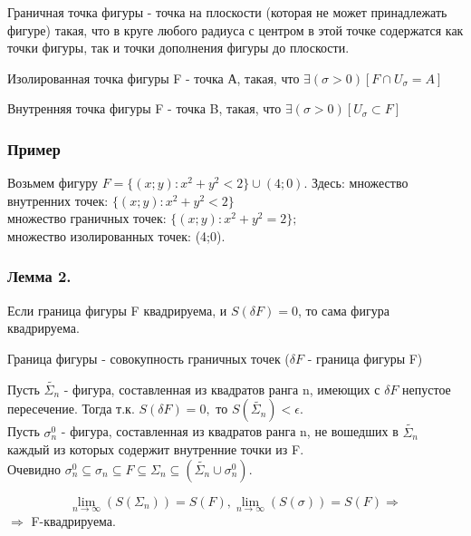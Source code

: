 \begin{opred}
Граничная точка фигуры - точка на плоскости (которая не может принадлежать фигуре) такая, что в круге любого радиуса с центром в этой точке содержатся как точки фигуры, так и точки дополнения фигуры до плоскости.
\end{opred}

\begin{opred}
Изолированная точка фигуры F - точка А, такая, что $\exists(\sigma > 0)[F \cap U_\sigma = A]$
\end{opred}

\begin{opred}
Внутренняя точка фигуры F - точка B, такая, что $\exists(\sigma > 0)[ U_\sigma \subset F]$
\end{opred}

\subsubsection{Пример}
Возьмем фигуру $F=\{(x;y):x^2+y^2<2\}\cup (4;0).$
Здесь: множество внутренних точек: $\{(x;y):x^2+y^2<2\}$
\\
множество граничных точек:
$\{(x;y):x^2+y^2=2\};$
\\
множество изолированных точек: (4;0).

\subsubsection{Лемма 2.}
Если граница фигуры F квадрируема, и $S(\delta F)=0$, то сама фигура квадрируема.

\begin{opred}
Граница фигуры - совокупность граничных точек ($\delta F$ - граница фигуры F)
\end{opred}

\dokvo
Пусть $\tilde{\Sigma_n}$ - фигура, составленная из квадратов ранга n, имеющих с $\delta F$ непустое пересечение. Тогда т.к. $S(\delta F) = 0,$ то $S(\tilde{\Sigma_n})<\epsilon$.
\\
Пусть $\sigma_n^0$ - фигура, составленная из квадратов ранга n, не вошедших в $\tilde{\Sigma_n}$ каждый из которых содержит внутренние точки из F.
\\
Очевидно $\sigma_n^0 \subseteq \sigma_n \subseteq F \subseteq \Sigma_n\subseteq (\tilde{\Sigma_n}\cup \sigma_n^0).$

$$
\lim_{n\to \infty}(S(\Sigma_n))=S(F), \lim_{n \to \infty}(S(\sigma))=S(F) \Rightarrow
$$
$\Rightarrow$ F-квадрируема.
\dokno

